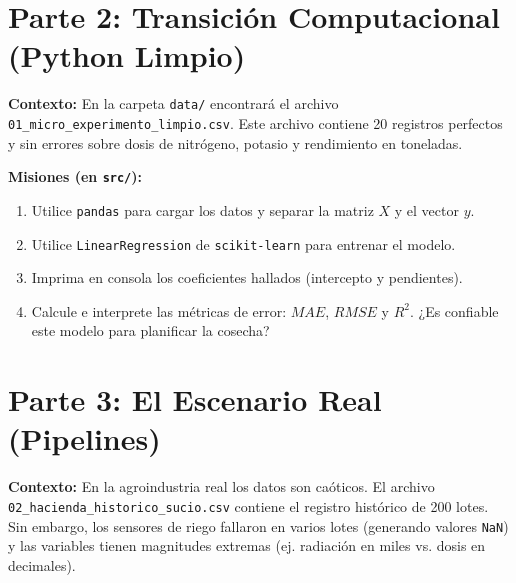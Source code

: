 \documentclass[12pt,a4paper]{article}
\begin{document}
\vspace{1cm}

\section{Parte 2: Transición Computacional (Python Limpio)}

\textbf{Contexto:} En la carpeta \texttt{data/} encontrará el archivo \texttt{01\_micro\_experimento\_limpio.csv}. Este archivo contiene 20 registros perfectos y sin errores sobre dosis de nitrógeno, potasio y rendimiento en toneladas.

\textbf{Misiones (en \texttt{src/}):}
\begin{enumerate}[label=\alph*)]
    \item Utilice \texttt{pandas} para cargar los datos y separar la matriz $X$ y el vector $y$.
    \item Utilice \texttt{LinearRegression} de \texttt{scikit-learn} para entrenar el modelo.
    \item Imprima en consola los coeficientes hallados (intercepto y pendientes).
    \item Calcule e interprete las métricas de error: $MAE$, $RMSE$ y $R^2$. ¿Es confiable este modelo para planificar la cosecha?



\end{enumerate}

\vspace{1cm}

\section{Parte 3: El Escenario Real (Pipelines)}

\textbf{Contexto:} En la agroindustria real los datos son caóticos. El archivo \texttt{02\_hacienda\_historico\_sucio.csv} contiene el registro histórico de 200 lotes. Sin embargo, los sensores de riego fallaron en varios lotes (generando valores \texttt{NaN}) y las variables tienen magnitudes extremas (ej. radiación en miles vs. dosis en decimales).
\end{document}
